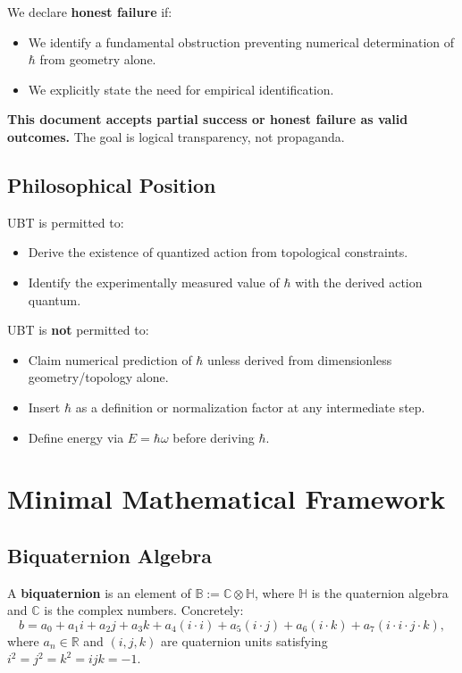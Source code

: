 \documentclass[12pt]{article}
\begin{document}
We declare \textbf{honest failure} if:
\begin{itemize}
\item We identify a fundamental obstruction preventing numerical determination of $\hbar$ from geometry alone.
\item We explicitly state the need for empirical identification.
\end{itemize}

\textbf{This document accepts partial success or honest failure as valid outcomes.} The goal is logical transparency, not propaganda.

\subsection{Philosophical Position}

UBT is permitted to:
\begin{itemize}
\item Derive the existence of quantized action from topological constraints.
\item Identify the experimentally measured value of $\hbar$ with the derived action quantum.
\end{itemize}

UBT is \textbf{not} permitted to:
\begin{itemize}
\item Claim numerical prediction of $\hbar$ unless derived from dimensionless geometry/topology alone.
\item Insert $\hbar$ as a definition or normalization factor at any intermediate step.
\item Define energy via $E = \hbar\omega$ before deriving $\hbar$.
\end{itemize}

\section{Minimal Mathematical Framework}

\subsection{Biquaternion Algebra}

A \textbf{biquaternion} is an element of $\mathbb{B} := \mathbb{C} \otimes \mathbb{H}$, where $\mathbb{H}$ is the quaternion algebra and $\mathbb{C}$ is the complex numbers. Concretely:
\[
b = a_0 + a_1 i + a_2 j + a_3 k + a_4 (i \cdot i) + a_5 (i \cdot j) + a_6 (i \cdot k) + a_7 (i \cdot i \cdot j \cdot k),
\]
where $a_n \in \mathbb{R}$ and $(i, j, k)$ are quaternion units satisfying $i^2 = j^2 = k^2 = ijk = -1$.
\end{document}
